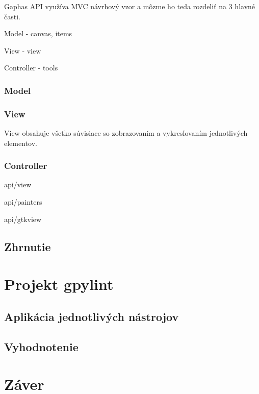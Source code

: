\documentclass[11pt,oneside,final]{fithesis2}
\begin{document}
Gaphas API využíva MVC návrhový vzor a môzme ho teda rozdeliť na 3 hlavné časti.
\begin{list}{•}{}
\item Model - canvas, items
\item View - view
\item Controller - tools
\end{list}

\subsection{Model}

    
\subsection{View}
View obsahuje všetko súvisiace so zobrazovaním a vykresľovaním jednotlivých elementov.

\subsection{Controller}

\begin{list}{•}{}
\item api/view
\item api/painters
\item api/gtkview
\end{list}
    
\section{Zhrnutie}    
    
\chapter{Projekt gpylint}
	\section{Aplikácia jednotlivých nástrojov}
	\section{Vyhodnotenie}	

\chapter{Záver}
\end{document}
